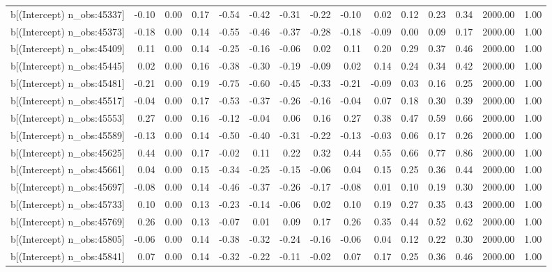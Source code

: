 \begin{table}[ht]
\begin{tabular}{rrrrrrrrrrrrrrr}
  b[(Intercept) n\_obs:45337] & -0.10 & 0.00 & 0.17 & -0.54 & -0.42 & -0.31 & -0.22 & -0.10 & 0.02 & 0.12 & 0.23 & 0.34 & 2000.00 & 1.00 \\ 
  b[(Intercept) n\_obs:45373] & -0.18 & 0.00 & 0.14 & -0.55 & -0.46 & -0.37 & -0.28 & -0.18 & -0.09 & 0.00 & 0.09 & 0.17 & 2000.00 & 1.00 \\ 
  b[(Intercept) n\_obs:45409] & 0.11 & 0.00 & 0.14 & -0.25 & -0.16 & -0.06 & 0.02 & 0.11 & 0.20 & 0.29 & 0.37 & 0.46 & 2000.00 & 1.00 \\ 
  b[(Intercept) n\_obs:45445] & 0.02 & 0.00 & 0.16 & -0.38 & -0.30 & -0.19 & -0.09 & 0.02 & 0.14 & 0.24 & 0.34 & 0.42 & 2000.00 & 1.00 \\ 
  b[(Intercept) n\_obs:45481] & -0.21 & 0.00 & 0.19 & -0.75 & -0.60 & -0.45 & -0.33 & -0.21 & -0.09 & 0.03 & 0.16 & 0.25 & 2000.00 & 1.00 \\ 
  b[(Intercept) n\_obs:45517] & -0.04 & 0.00 & 0.17 & -0.53 & -0.37 & -0.26 & -0.16 & -0.04 & 0.07 & 0.18 & 0.30 & 0.39 & 2000.00 & 1.00 \\ 
  b[(Intercept) n\_obs:45553] & 0.27 & 0.00 & 0.16 & -0.12 & -0.04 & 0.06 & 0.16 & 0.27 & 0.38 & 0.47 & 0.59 & 0.66 & 2000.00 & 1.00 \\ 
  b[(Intercept) n\_obs:45589] & -0.13 & 0.00 & 0.14 & -0.50 & -0.40 & -0.31 & -0.22 & -0.13 & -0.03 & 0.06 & 0.17 & 0.26 & 2000.00 & 1.00 \\ 
  b[(Intercept) n\_obs:45625] & 0.44 & 0.00 & 0.17 & -0.02 & 0.11 & 0.22 & 0.32 & 0.44 & 0.55 & 0.66 & 0.77 & 0.86 & 2000.00 & 1.00 \\ 
  b[(Intercept) n\_obs:45661] & 0.04 & 0.00 & 0.15 & -0.34 & -0.25 & -0.15 & -0.06 & 0.04 & 0.15 & 0.25 & 0.36 & 0.44 & 2000.00 & 1.00 \\ 
  b[(Intercept) n\_obs:45697] & -0.08 & 0.00 & 0.14 & -0.46 & -0.37 & -0.26 & -0.17 & -0.08 & 0.01 & 0.10 & 0.19 & 0.30 & 2000.00 & 1.00 \\ 
  b[(Intercept) n\_obs:45733] & 0.10 & 0.00 & 0.13 & -0.23 & -0.14 & -0.06 & 0.02 & 0.10 & 0.19 & 0.27 & 0.35 & 0.43 & 2000.00 & 1.00 \\ 
  b[(Intercept) n\_obs:45769] & 0.26 & 0.00 & 0.13 & -0.07 & 0.01 & 0.09 & 0.17 & 0.26 & 0.35 & 0.44 & 0.52 & 0.62 & 2000.00 & 1.00 \\ 
  b[(Intercept) n\_obs:45805] & -0.06 & 0.00 & 0.14 & -0.38 & -0.32 & -0.24 & -0.16 & -0.06 & 0.04 & 0.12 & 0.22 & 0.30 & 2000.00 & 1.00 \\ 
  b[(Intercept) n\_obs:45841] & 0.07 & 0.00 & 0.14 & -0.32 & -0.22 & -0.11 & -0.02 & 0.07 & 0.17 & 0.25 & 0.36 & 0.46 & 2000.00 & 1.00 \\ 

\end{tabular}
\end{table}
